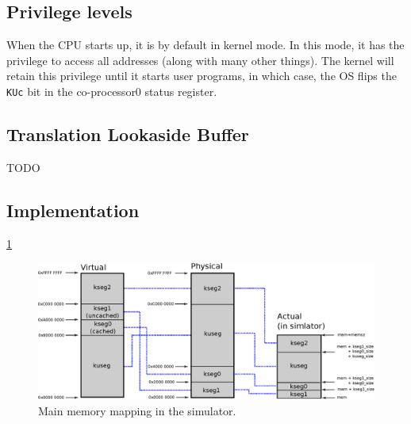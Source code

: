 \subsection{Privilege levels}
When the CPU starts up, it is by default in kernel mode. In this mode, it has
the privilege to access all addresses (along with many other things). The
kernel will retain this privilege until it starts user programs, in which case,
the OS flips the \texttt{KUc} bit in the co-processor0 status register\cite{harvard_mips_summary}.

\subsection{Translation Lookaside Buffer}
TODO

\subsection{Implementation}
\ref{fig:address_space_mapping}

\begin{figure}[ht]
	\centering
	\includegraphics[scale=0.70]{mmu/memory_mapping.eps}
	\caption{Main memory mapping in the simulator.}
	\label{fig:address_space_mapping}
\end{figure}
